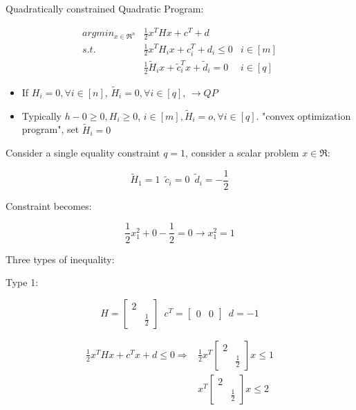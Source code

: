 Quadratically constrained Quadratic Program:

\begin{align*}
argmin_{x\in \Re^n} &\frac{1}{2}x^THx + c^T + d\\
s.t. &\frac{1}{2}x^TH_ix + c^T_i + d_i \leq 0  & i\in [m]\\
&\frac{1}{2}\tilde{H}_ix + \tilde{c}_i^Tx + \tilde{d}_i = 0 & i\in [q]
\end{align*}

\begin{itemize}
	\item If $H_i = 0, \forall i\in [n]$, $\tilde{H}_i = 0, \forall i\in [q]$, $\rightarrow QP$
	
	\item Typically $h-0\geq 0, H_i\geq 0$, $i\in [m], \tilde{H}_i = o, \forall i\in [q]$. "convex optimization program", set $\tilde{H}_i = 0$
\end{itemize}
Consider a single equality constraint $q = 1$, consider a scalar problem $x\in \Re$:

\begin{equation*}
\tilde{H}_1 = 1 \,\,\, \tilde{c}_i = 0 \,\,\, \tilde{d}_i = -\frac{1}{2}
\end{equation*}

Constraint becomes:

\begin{equation*}
\frac{1}{2}x_1^2 + 0 - \frac{1}{2} = 0\rightarrow x_1^2 = 1
\end{equation*}

Three types of inequality:

Type 1:

\begin{equation*}
H=\begin{bmatrix}
2 &\\
&\frac{1}{2}
\end{bmatrix}\,\,\,c^T = \begin{bmatrix}
0 & 0
\end{bmatrix}\,\,\,
d = -1
\end{equation*}

\begin{align*}
\frac{1}{2}x^THx + c^Tx + d \leq 0\Rightarrow &\frac{1}{2}x^T\begin{bmatrix}
2&\\
&\frac{1}{2}
\end{bmatrix}x\leq 1\\
&x^T\begin{bmatrix}
2&\\
&\frac{1}{2}
\end{bmatrix}x \leq 2
\end{align*}

